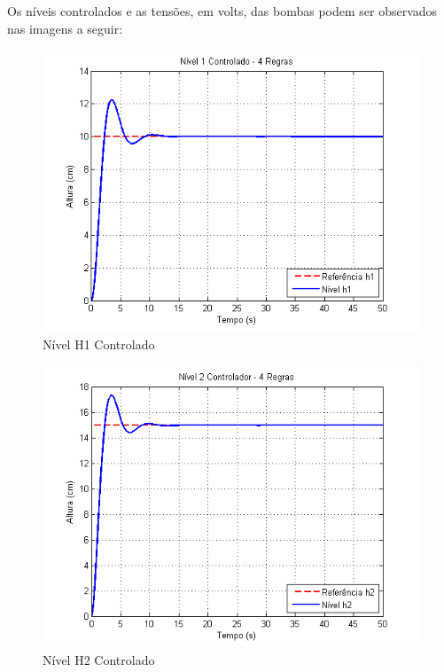 Os níveis controlados e as tensões, em volts, das bombas podem ser observados nas imagens a seguir:
\begin{figure}[H]
	\centering
	\includegraphics[height=0.35\paperheight ,keepaspectratio]{img/ctrl_h1ts2_free.png}
	\caption{\small Nível H1 Controlado }
	\label{figH1TSCtrl2_free}
\end{figure}

\begin{figure}[H]
	\centering
	\includegraphics[height=0.35\paperheight ,keepaspectratio]{img/ctrl_h2ts2_free.png}
	\caption{Nível H2 Controlado }
	\label{figH2CtrlTS2_free}
\end{figure}

